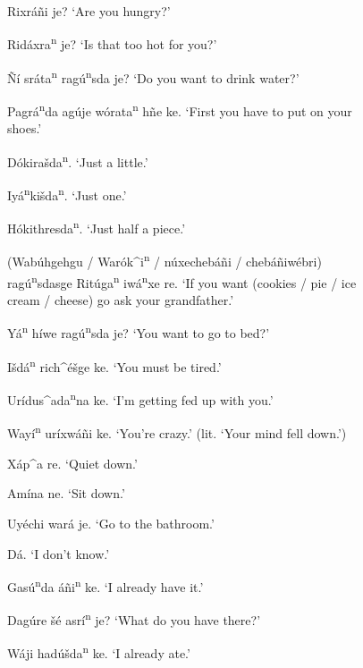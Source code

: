\documentclass[output=paper]{LSP/langsci}
\begin{document}
\begin{figure}[p]
\begin{list}{}{} \itemsep1pt \parskip0pt 

\item{Rixr\'a\~ni je? `Are you hungry?'}
\item{Rid\'axra\textsuperscript{n} je? `Is that too hot for you?'}
\item{\~N\'i sr\'ata\textsuperscript{n} rag\'u\textsuperscript{n}sda je? `Do you want to drink water?'}
\item{Pagr\'a\textsuperscript{n}da ag\'uje w\'orata\textsuperscript{n} h\~ne ke. `First you have to put on your shoes.'}
\item{D\'okira\v{s}da\textsuperscript{n}.	`Just a little.'}
\item{}
\item{Iy\'a\textsuperscript{n}ki\v{s}da\textsuperscript{n}. `Just one.'}
\item{H\'okithre{s}da\textsuperscript{n}. `Just half a piece.'}
\item{(Wab\'uhgehgu / War\'ok\^{ }i\textsuperscript{n} / n\'uxecheb\'a\~ni / cheb\'a\~niw\'ebri) rag\'u\textsuperscript{n}sdasge Rit\'uga\textsuperscript{n} iw\'a\textsuperscript{n}xe re. `If you want (cookies / pie / ice cream / cheese) go ask your grandfather.'}
\item{Y\'a\textsuperscript{n} h\'iwe rag\'u\textsuperscript{n}sda je? `You want to go to bed?'}
\item{I\v{s}d\'a\textsuperscript{n} rich\^{ }\'e\v{s}ge ke. `You must be tired.'}
\item{}
\item{Ur\'idus\^{ }ada\textsuperscript{n}na ke. `I'm getting fed up with you.'}
\item{Way\'i\textsuperscript{n} ur\'ixw\'a\~ni ke. `You're crazy.' (lit. `Your mind fell down.')}
\item{X\'ap\^{ }a re. `Quiet down.'}
\item{Am\'ina ne. `Sit down.'	}
\item{Uy\'echi war\'a je. `Go to the bathroom.'}
\item{}
\item{Dá.	`I don't know.'}
\item{Gas\'u\textsuperscript{n}da \'a\~ni\textsuperscript{n} ke.	`I already have it.'}
\item{Dag\'ure \v{s}\'e asrí\textsuperscript{n} je?	 `What do you have there?'}
\item{W\'aji had\'u\v{s}da\textsuperscript{n} ke. `I already ate.'}

\end{list}
\end{figure}
\end{document}
